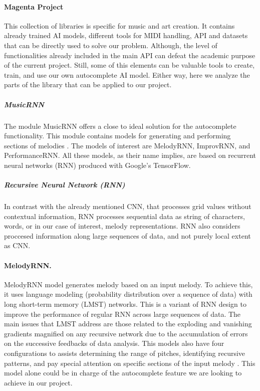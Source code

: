 \paragraph{Magenta Project} This collection of libraries is specific for music and art
creation. It contains already trained AI models, different tools for MIDI handling, API
and datasets that can be directly used to solve our problem. Although, the level of
functionalities already included in the main API can defeat the academic purpose of the
current project. Still, some of this elements can be valuable tools to create, train, and
use our own autocomplete AI model. Either way, here we analyze the parts of the library that
can be applied to our project.

\subparagraph{MusicRNN} The module MusicRNN offers a close to ideal solution for the
autocomplete functionality. This module contains models for generating and performing
sections of melodies \autocite{musicRNN}. The models of interest are MelodyRNN, ImprovRNN,
and PerformanceRNN. All these models, as their name implies, are based on recurrent neural
networks (RNN) produced with Google's TensorFlow.

\subparagraph{Recursive Neural Network (RNN)} In contrast with the already mentioned CNN,
that processes grid values without contextual information, RNN processes sequential data
as string of characters, words, or in our case of interest, melody representations. RNN
also considers proccesed information along large sequences of data, and not purely local
extent as CNN.\autocite{fundamentalML}

\paragraph{MelodyRNN.}
MelodyRNN model generates melody based on an input melody. To achieve this, it uses
language modeling (probability distribution over a sequence of data) with long short-term
memory (LMST) networks. This is a variant of RNN design to improve the performance of
regular RNN across large sequences of data. The main issues that LMST address are those
related to the exploding and vanishing gradients magnified on any recursive network due to
the accumulation of errors on the successive feedbacks of data analysis. This models also
have four configurations to assists determining the range of pitches, identifying
recursive patterns, and pay special attention on specific sections of the input melody
\autocite{melodyRNN}. This model alone could be in charge of the autocomplete feature we
are looking to achieve in our project.

